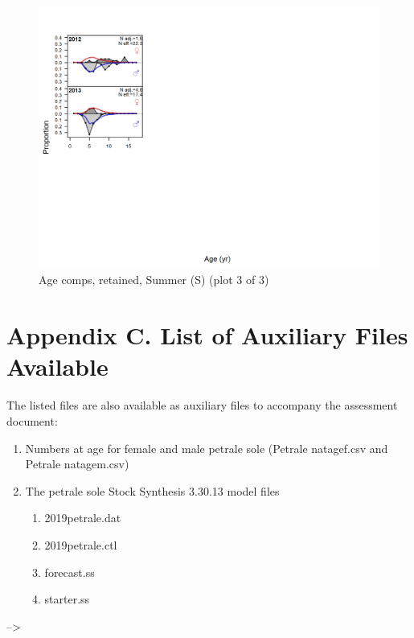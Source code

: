 \documentclass[12pt,]{article}
\begin{document}
\begin{figure}
\centering
\includegraphics{r4ss/plots_mod1/comp_agefit_flt4mkt2_page3.png}
\caption{Age comps, retained, Summer (S) (plot 3 of 3)
\label{fig:age_fits}}
\end{figure}

\FloatBarrier

\newpage

\section{Appendix C. List of Auxiliary Files
Available}\label{appendix-c.-list-of-auxiliary-files-available}

The listed files are also available as auxiliary files to accompany the
assessment document:

\begin{enumerate}
  \item Numbers at age for female and male petrale sole (Petrale natagef.csv and Petrale natagem.csv)
  \item The petrale sole Stock Synthesis 3.30.13 model files
  
  \begin{enumerate}
    \item 2019petrale.dat
    \item 2019petrale.ctl
    \item forecast.ss
    \item starter.ss
  \end{enumerate}
\end{enumerate}

\newpage

--\textgreater{}
\end{document}
